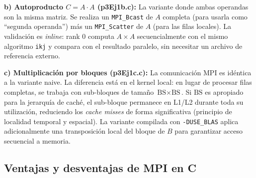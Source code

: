 \documentclass[12pt,a4paper]{article}
\begin{document}
\textbf{b) Autoproducto $C = A \cdot A$ (p3Ej1b.c):} La variante donde ambas
operandas son la misma matriz. Se realiza un \texttt{MPI\_Bcast} de $A$ completa
(para usarla como ``segunda operanda'') más un \texttt{MPI\_Scatter} de $A$ (para
las filas locales). La validación es \textit{inline}: rank 0 computa $A \times A$
secuencialmente con el mismo algoritmo \texttt{ikj} y compara con el resultado
paralelo, sin necesitar un archivo de referencia externo.

\textbf{c) Multiplicación por bloques (p3Ej1c.c):} La comunicación MPI es idéntica
a la variante naive. La diferencia está en el kernel local: en lugar de procesar filas
completas, se trabaja con sub-bloques de tamaño $\text{BS} \times \text{BS}$. Si
$\text{BS}$ es apropiado para la jerarquía de caché, el sub-bloque permanece en L1/L2
durante toda su utilización, reduciendo los \textit{cache misses} de forma
significativa (principio de localidad temporal y espacial). La variante compilada con
\texttt{-DUSE\_BLAS} aplica adicionalmente una transposición local del bloque de $B$
para garantizar acceso secuencial a memoria.

\subsection{Ventajas y desventajas de MPI en C}
\end{document}
